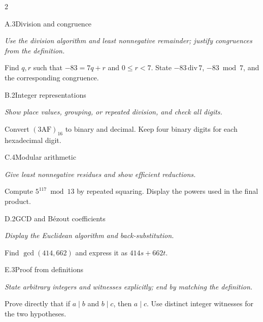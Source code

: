 \documentclass[9pt]{extarticle}
\begin{document}
\begin{multicols}{2}
\begin{CoreProblem}{A.3}{Division and congruence}
{\scriptsize\textit{Use the division algorithm and least nonnegative remainder; justify congruences from the definition.}\par}
Find $q,r$ such that $-83=7q+r$ and $0\le r<7$. State
$-83\,\mathrm{div}\,7$, $-83\bmod7$, and the corresponding congruence.
\end{CoreProblem}
\begin{CoreProblem}{B.2}{Integer representations}
{\scriptsize\textit{Show place values, grouping, or repeated division, and check all digits.}\par}
Convert $(\mathrm{3AF})_{16}$ to binary and decimal. Keep four binary digits
for each hexadecimal digit.
\end{CoreProblem}
\begin{CoreProblem}{C.4}{Modular arithmetic}
{\scriptsize\textit{Give least nonnegative residues and show efficient reductions.}\par}
Compute $5^{117}\bmod13$ by repeated squaring. Display the powers used in the
final product.
\end{CoreProblem}
\columnbreak
\begin{CoreProblem}{D.2}{GCD and B\'ezout coefficients}
{\scriptsize\textit{Display the Euclidean algorithm and back-substitution.}\par}
Find $\gcd(414,662)$ and express it as $414s+662t$.
\end{CoreProblem}
\begin{CoreProblem}{E.3}{Proof from definitions}
{\scriptsize\textit{State arbitrary integers and witnesses explicitly; end by matching the definition.}\par}
Prove directly that if $a\mid b$ and $b\mid c$, then $a\mid c$. Use distinct
integer witnesses for the two hypotheses.
\end{CoreProblem}
\end{multicols}
\CoreWorkArea
\FormBreak
{}
\end{document}
